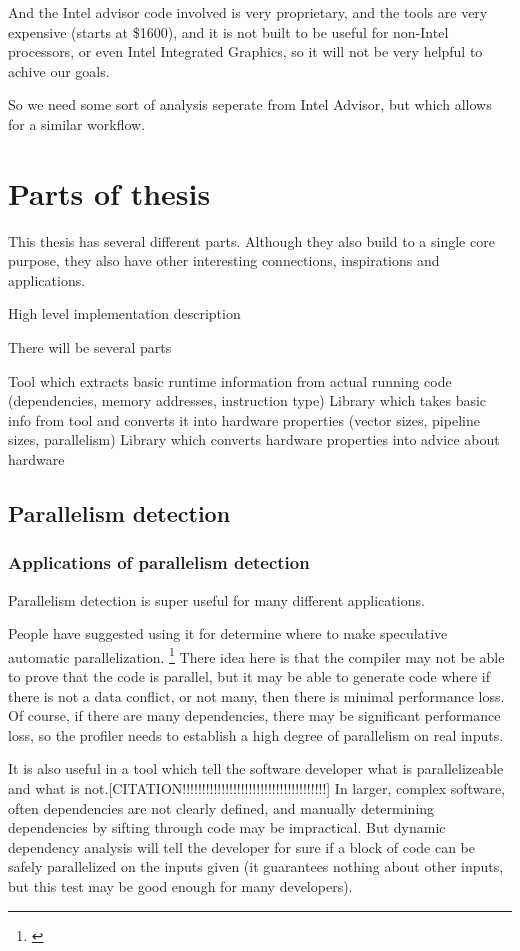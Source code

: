 \documentclass[12pt,twoside]{reedthesis}
\begin{document}
		And the Intel advisor code involved is very proprietary, and the tools are very expensive (starts at \$1600), and it is not built to be useful for non-Intel processors, or even Intel Integrated Graphics, so it will not be very helpful to achive our goals.
		
		So we need some sort of analysis seperate from Intel Advisor, but which allows for a similar workflow. 
		
	\section{Parts of thesis}
		
		This thesis has several different parts. Although they also build to a single core purpose, they also have other interesting connections, inspirations and applications. 
		
		
		High level implementation description
		
		There will be several parts
		
		Tool which extracts basic runtime information from actual running code (dependencies, memory addresses, instruction type)
		Library which takes basic info from tool and converts it into hardware properties (vector sizes, pipeline sizes, parallelism)
		Library which converts hardware properties into advice about hardware
		
	
	\subsection{Parallelism detection}
		
		\subsubsection{Applications of parallelism detection}
		
		Parallelism detection is super useful for many different applications. 
		
		People have suggested using it for determine where to make speculative automatic parallelization. \footnote{\cite{Chen:2004}} There idea here is that the compiler may not be able to prove that the code is parallel, but it may be able to generate code where if there is not a data conflict, or not many, then there is minimal performance loss. Of course, if there are many dependencies, there may be significant performance loss, so the profiler needs to establish a high degree of parallelism on real inputs. 
		
		It is also useful in a tool which tell the software developer what is parallelizeable and what is not.[CITATION!!!!!!!!!!!!!!!!!!!!!!!!!!!!!!!!!!!!!]
		In larger, complex software, often dependencies are not clearly defined, and manually determining dependencies by sifting through code may be impractical. But dynamic dependency analysis will tell the developer for sure if a block of code can be safely parallelized on the inputs given (it guarantees nothing about other inputs, but this test may be good enough for many developers).
		
\end{document}
